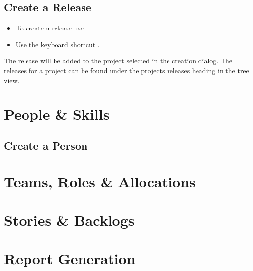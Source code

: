 \documentclass[11pt,fleqn]{book} %
\begin{document}
\subsection{Create a Release}
    \begin{itemize}
        \item To create a release use .
        \item Use the keyboard shortcut .
    \end{itemize}
    The release will be added to the project selected in the creation dialog.
    The releases for a project can be found under the projects releases heading in the tree view.

\section{People \& Skills}
\subsection{Create a Person}


\section{Teams, Roles \& Allocations}
\section{Stories \& Backlogs}
\section{Report Generation}
\end{document}
